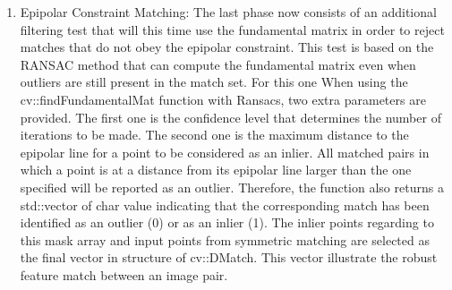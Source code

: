 \begin {enumerate}
  \item Epipolar Constraint Matching: The last phase now consists of an additional filtering test that will this time use the fundamental matrix in order to reject matches that do not obey the epipolar constraint. This test is based on the RANSAC method that can compute the fundamental matrix even when outliers are still present in the match set. For this one When using the cv::findFundamentalMat function with Ransacs, two extra parameters are provided. The first one is the confidence level that determines the number of iterations to be made. The second one is the maximum distance to the epipolar line for a point to be considered as an inlier. All matched pairs in which a point is at a distance from its epipolar line larger than the one specified will be reported as an outlier. Therefore, the function also returns a std::vector of char value indicating that the corresponding match has been identified as an outlier (0) or as an inlier (1). The inlier points regarding to this mask array and input points from symmetric matching are selected as the final vector in structure of cv::DMatch. This vector illustrate the robust feature match between an image pair.
\end {enumerate}





